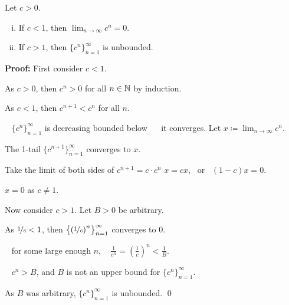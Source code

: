 \documentclass[10pt,aspectratio=149]{beamer}
\begin{document}
\begin{frame}

\begin{proposition}
Let $c > 0$.
\pause
\begin{enumerate}[(i)]
\item
If $c < 1$, then
$\displaystyle
\lim_{n\to\infty} c^n = 0$.
\item
\pause
If $c > 1$, then $\{ c^n \}_{n=1}^\infty$ is unbounded.
\end{enumerate}
\end{proposition}

\pause
\textbf{Proof:}
First consider $c < 1$.

\pause
As $c > 0$, then $c^n > 0$ for all $n \in {\mathbb{N}}$ by induction.

\pause
As $c < 1$, then $c^{n+1} < c^n$ for all $n$.

\pause
\thus~ $\{ c^n \}_{n=1}^\infty$ is decreasing bounded below ~\thus~ it
converges.
\pause
Let $\displaystyle x \coloneqq \lim_{n\to\infty} c^n$.

\pause
The 1-tail $\{ c^{n+1} \}_{n=1}^\infty$ converges to $x$.

\pause
Take the limit of both sides of $c^{n+1} = c \cdot c^n$ \wthus  $x = cx$,
~or~ $(1-c)x=0$.

\pause
\thus \quad $x=0$ as $c \not= 1$.

\pause
\medskip

Now consider $c > 1$.
\pause
\quad
Let $B > 0$ be arbitrary.

\pause
As $\nicefrac{1}{c} < 1$, then $\bigl\{ {(\nicefrac{1}{c})}^n
\bigr\}_{n=1}^\infty$ converges to $0$.

\pause
\thus~ for some large enough $n$, ~
$\frac{1}{c^n} =
{\left(\frac{1}{c}\right)}^n < \frac{1}{B}$.

\pause
\thus ~ $c^n > B$, and $B$ is not an upper bound for $\{ c^n \}_{n=1}^\infty$.

\pause
As $B$ was arbitrary, $\{ c^n \}_{n=1}^\infty$ is unbounded.
\qed

\end{frame}
\end{document}
